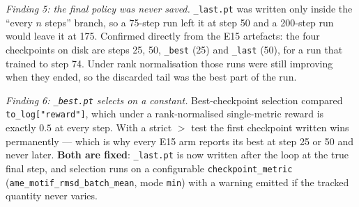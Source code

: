 \emph{Finding 5: the final policy was never saved.} \texttt{\_last.pt} was
written only inside the ``every $n$ steps'' branch, so a 75-step run left it at
step 50 and a 200-step run would leave it at 175. Confirmed directly from the
E15 artefacts: the four checkpoints on disk are steps 25, 50, \texttt{\_best}
(25) and \texttt{\_last} (50), for a run that trained to step 74. Under rank
normalisation those runs were still improving when they ended, so the discarded
tail was the best part of the run.

\emph{Finding 6: \texttt{\_best.pt} selects on a constant.} Best-checkpoint
selection compared \texttt{to\_log["reward"]}, which under a rank-normalised
single-metric reward is exactly $0.5$ at every step. With a strict $>$ test the
first checkpoint written wins permanently --- which is why every E15 arm reports
its best at step 25 or 50 and never later. \textbf{Both are fixed}:
\texttt{\_last.pt} is now written after the loop at the true final step, and
selection runs on a configurable \texttt{checkpoint\_metric}
(\texttt{ame\_motif\_rmsd\_batch\_mean}, mode \texttt{min}) with a warning
emitted if the tracked quantity never varies.

